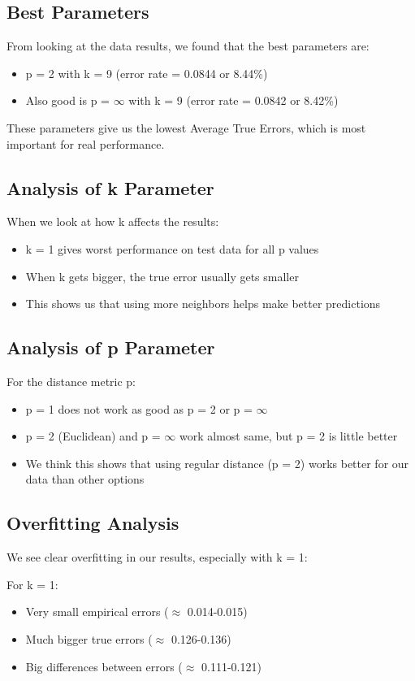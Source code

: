 \documentclass{article}
\begin{document}
\subsection{Best Parameters}
From looking at the data results, we found that the best parameters are:
\begin{itemize}
    \item p = 2 with k = 9 (error rate = 0.0844 or 8.44\%)
    \item Also good is p = $\infty$ with k = 9 (error rate = 0.0842 or 8.42\%)
\end{itemize}

These parameters give us the lowest Average True Errors, which is most important for real performance.

\subsection{Analysis of k Parameter}
When we look at how k affects the results:
\begin{itemize}
    \item k = 1 gives worst performance on test data for all p values
    \item When k gets bigger, the true error usually gets smaller
    \item This shows us that using more neighbors helps make better predictions
\end{itemize}

\subsection{Analysis of p Parameter}
For the distance metric p:
\begin{itemize}
    \item p = 1 does not work as good as p = 2 or p = $\infty$
    \item p = 2 (Euclidean) and p = $\infty$ work almost same, but p = 2 is little better
    \item We think this shows that using regular distance (p = 2) works better for our data than other options
\end{itemize}

\subsection{Overfitting Analysis}
We see clear overfitting in our results, especially with k = 1:

For k = 1:
\begin{itemize}
    \item Very small empirical errors ($\approx$ 0.014-0.015)
    \item Much bigger true errors ($\approx$ 0.126-0.136)
    \item Big differences between errors ($\approx$ 0.111-0.121)
\end{itemize}
\end{document}
